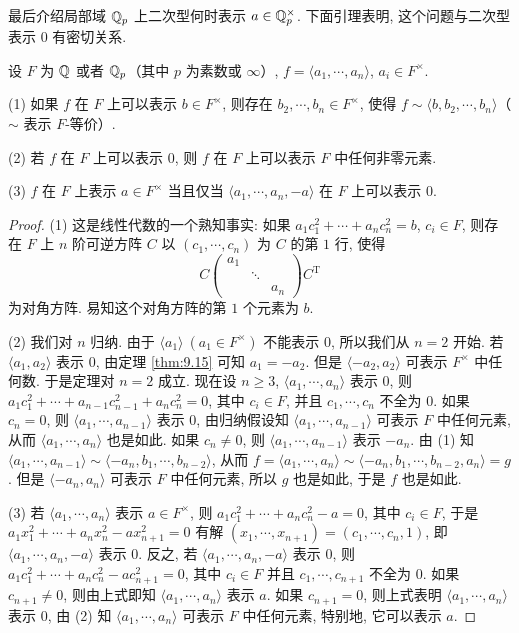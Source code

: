 最后介绍局部域 $\mathbb{Q}_p$ 上二次型何时表示 $a\in\mathbb{Q}_p^{\times}$. 下面引理表明, 这个问题与二次型表示 $0$ 有密切关系.

\begin{lemma}\label{lem:ch9-5}
设 $F$ 为 $\mathbb{Q}$ 或者 $\mathbb{Q}_p$（其中 $p$ 为素数或 $\infty$）, $f=\langle a_1,\cdots,a_n\rangle$, $a_i\in F^{\times}$.

(1) 如果 $f$ 在 $F$ 上可以表示 $b\in F^{\times}$, 则存在 $b_2,\cdots,b_n\in F^{\times}$, 使得 $f\sim\langle b,b_2,\cdots,b_n\rangle$（$\sim$ 表示 $F$-等价）.

(2) 若 $f$ 在 $F$ 上可以表示 $0$, 则 $f$ 在 $F$ 上可以表示 $F$ 中任何非零元素.

(3) $f$ 在 $F$ 上表示 $a\in F^{\times}$ 当且仅当 $\langle a_1,\cdots,a_n,-a\rangle$ 在 $F$ 上可以表示 $0$.
\end{lemma}

\begin{proof}
(1) 这是线性代数的一个熟知事实: 如果 $a_1c_1^2+\cdots+a_nc_n^2=b$, $c_i\in F$, 则存在 $F$ 上 $n$ 阶可逆方阵 $C$ 以 $(c_1,\cdots,c_n)$ 为 $C$ 的第 $1$ 行, 使得
\[
  C\left(\begin{array}{ccc}a_1& &\\ & \ddots &\\ & & a_n\end{array}\right)C^{\mathrm{T}}
\]
为对角方阵. 易知这个对角方阵的第 $1$ 个元素为 $b$.

(2) 我们对 $n$ 归纳. 由于 $\langle a_1\rangle\ (a_1\in F^{\times})$ 不能表示 $0$, 所以我们从 $n=2$ 开始. 若 $\langle a_1,a_2\rangle$ 表示 $0$, 由定理 \ref{thm:9.15} 可知 $a_1=-a_2$. 但是 $\langle -a_2,a_2\rangle$ 可表示 $F^{\times}$ 中任何数. 于是定理对 $n=2$ 成立. 现在设 $n\geqslant 3$, $\langle a_1,\cdots,a_n\rangle$ 表示 $0$, 则 $a_1c_1^2+\cdots+a_{n-1}c_{n-1}^2+a_nc_n^2=0$, 其中 $c_i\in F$, 并且 $c_1,\cdots,c_n$ 不全为 $0$. 如果 $c_n=0$, 则 $\langle a_1,\cdots,a_{n-1}\rangle$ 表示 $0$, 由归纳假设知 $\langle a_1,\cdots,a_{n-1}\rangle$ 可表示 $F$ 中任何元素, 从而 $\langle a_1,\cdots,a_n\rangle$ 也是如此. 如果 $c_n\neq 0$, 则 $\langle a_1,\cdots,a_{n-1}\rangle$ 表示 $-a_n$. 由 (1) 知 $\langle a_1,\cdots,a_{n-1}\rangle\sim\langle -a_n,b_1,\cdots,b_{n-2}\rangle$, 从而 $f=\langle a_1,\cdots,a_n\rangle\sim\langle -a_n,b_1,\cdots,b_{n-2},a_n\rangle=g$. 但是 $\langle -a_n,a_n\rangle$ 可表示 $F$ 中任何元素, 所以 $g$ 也是如此, 于是 $f$ 也是如此.

(3) 若 $\langle a_1,\cdots,a_n\rangle$ 表示 $a\in F^{\times}$, 则 $a_1c_1^2+\cdots+a_nc_n^2-a=0$, 其中 $c_i\in F$, 于是 $a_1x_1^2+\cdots+a_nx_n^2-ax_{n+1}^2=0$ 有解 $(x_1,\cdots,x_{n+1})=(c_1,\cdots,c_n,1)$, 即 $\langle a_1,\cdots,a_n,-a\rangle$ 表示 $0$. 反之, 若 $\langle a_1,\cdots,a_n,-a\rangle$ 表示 $0$, 则 $a_1c_1^2+\cdots+a_nc_n^2-ac_{n+1}^2=0$, 其中 $c_i\in F$ 并且 $c_1,\cdots,c_{n+1}$ 不全为 $0$. 如果 $c_{n+1}\neq 0$, 则由上式即知 $\langle a_1,\cdots,a_n\rangle$ 表示 $a$. 如果 $c_{n+1}=0$, 则上式表明 $\langle a_1,\cdots,a_n\rangle$ 表示 $0$, 由 (2) 知 $\langle a_1,\cdots,a_n\rangle$ 可表示 $F$ 中任何元素, 特别地, 它可以表示 $a$.
\end{proof}

